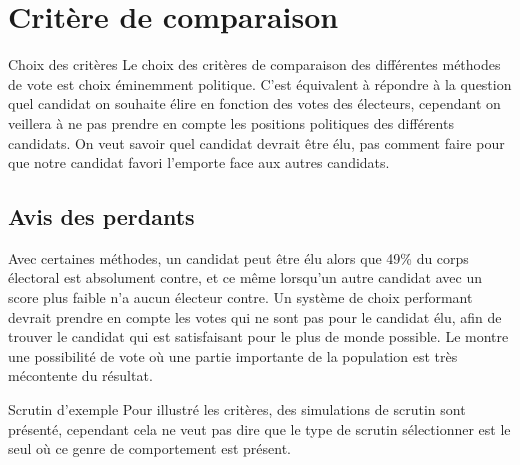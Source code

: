 \documentclass[../report]{subfiles}
\begin{document}
  
  \chapter{Critère de comparaison}
  
  \begin{important}{Choix des critères}
  	Le choix des critères de comparaison des différentes méthodes de vote est choix 
  	éminemment politique.
  	C'est équivalent à répondre à la question quel candidat on souhaite élire en fonction
  	des votes des électeurs, cependant on veillera à ne pas prendre en compte les positions 
  	politiques des différents candidats.
  	On veut savoir quel candidat devrait être élu, pas comment faire pour que notre candidat 
  	favori l'emporte face aux autres candidats.
  \end{important}


  \section{Avis des perdants}

  Avec certaines méthodes, un candidat peut être élu alors que 49\% du corps électoral est
  absolument contre, et ce même lorsqu'un autre candidat avec un score plus faible n'a aucun
  électeur contre.
  Un système de choix performant devrait prendre en compte les votes qui ne sont pas pour le candidat
  élu, afin de trouver le candidat qui est satisfaisant pour le plus de monde possible.
  Le  montre une possibilité de vote où une partie importante de la population 
  est très mécontente du résultat.

  \begin{nota}{Scrutin d'exemple}
	Pour illustré les critères, des simulations de scrutin sont présenté, cependant cela ne 
	veut pas dire que le type de scrutin sélectionner est le seul où ce genre de comportement 
	est présent.
  \end{nota}

	\begin{table}[h]
		\begin{center}
			\caption{Exemple de cas où une grande partie de la population est mécontente}%
			\label{fig:critere:perdant:example}
		\end{center}
	\end{table}
  
\end{document}
